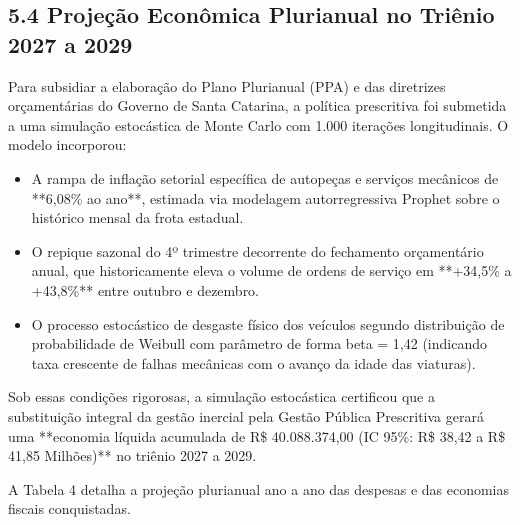 \documentclass[10pt,a4paper,journal]{article}
\begin{document}
\subsection{5.4 Projeção Econômica Plurianual no Triênio 2027 a 2029}
Para subsidiar a elaboração do Plano Plurianual (PPA) e das diretrizes orçamentárias do Governo de Santa Catarina, a política prescritiva foi submetida a uma simulação estocástica de Monte Carlo com 1.000 iterações longitudinais. O modelo incorporou:

\begin{itemize}
\item A rampa de inflação setorial específica de autopeças e serviços mecânicos de **6,08\% ao ano**, estimada via modelagem autorregressiva Prophet sobre o histórico mensal da frota estadual.
\end{itemize}
\begin{itemize}
\item O repique sazonal do 4º trimestre decorrente do fechamento orçamentário anual, que historicamente eleva o volume de ordens de serviço em **+34,5\% a +43,8\%** entre outubro e dezembro.
\end{itemize}
\begin{itemize}
\item O processo estocástico de desgaste físico dos veículos segundo distribuição de probabilidade de Weibull com parâmetro de forma beta = 1,42 (indicando taxa crescente de falhas mecânicas com o avanço da idade das viaturas).
\end{itemize}
Sob essas condições rigorosas, a simulação estocástica certificou que a substituição integral da gestão inercial pela Gestão Pública Prescritiva gerará uma **economia líquida acumulada de R\$ 40.088.374,00 (IC 95\%: R\$ 38,42 a R\$ 41,85 Milhões)** no triênio 2027 a 2029.

A Tabela 4 detalha a projeção plurianual ano a ano das despesas e das economias fiscais conquistadas.
\end{document}
